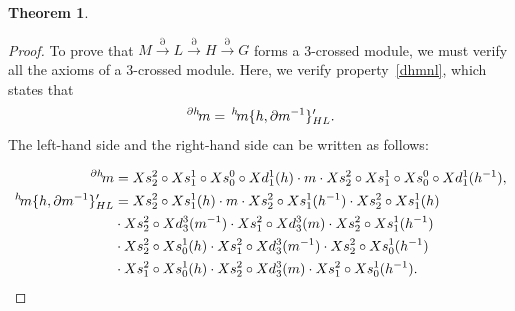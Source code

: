 \documentclass{tac}
\newtheorem{theorem}{Theorem}
\newcommand{\act}[1]{\,\sp{#1}\!}
\begin{document}
\begin{theorem}
\begin{enumerate}[label=(\roman*)]
\end{enumerate}
\end{theorem}


\begin{proof}
To prove that $M \xrightarrow{\partial} L \xrightarrow{\partial} H \xrightarrow{\partial} G$  forms a 3-crossed module, we must verify all the axioms of a 3-crossed module. Here, we verify property \ref{dhmnl}, which states that 
\[
\act{\partial h}m = \act{h}m\{h,\partial m^{-1}\}'_{HL}.
\]
The left-hand side and the right-hand side can be written as follows:

\begin{align*}
\act{\partial h}m &=
Xs^2_2\circ Xs^1_1\circ Xs^0_0\circ Xd^1_1(h)\cdot m\cdot Xs^2_2\circ Xs^1_1\circ Xs^0_0\circ Xd^1_1(h^{-1}),\\
\act{h}m\{h,\partial m^{-1}\}'_{HL} &= 
Xs^2_2\circ Xs^1_1(h)\cdot m\cdot Xs^2_2\circ Xs^1_1(h^{-1})\cdot Xs^2_2\circ Xs^1_1(h)\\
&\cdot Xs^2_2\circ Xd^3_3(m^{-1})\cdot Xs^2_1\circ Xd^3_3(m)\cdot Xs^2_2\circ Xs^1_1(h^{-1})\\
&\cdot Xs^2_2\circ Xs^1_0(h)\cdot Xs^2_1\circ Xd^3_3(m^{-1})\cdot Xs^2_2\circ Xs^1_0(h^{-1})\\
&\cdot Xs^2_1\circ Xs^1_0(h)\cdot Xs^2_2\circ Xd^3_3(m)\cdot Xs^2_1\circ Xs^1_0(h^{-1}).
\end{align*}


\end{proof}
\end{document}
